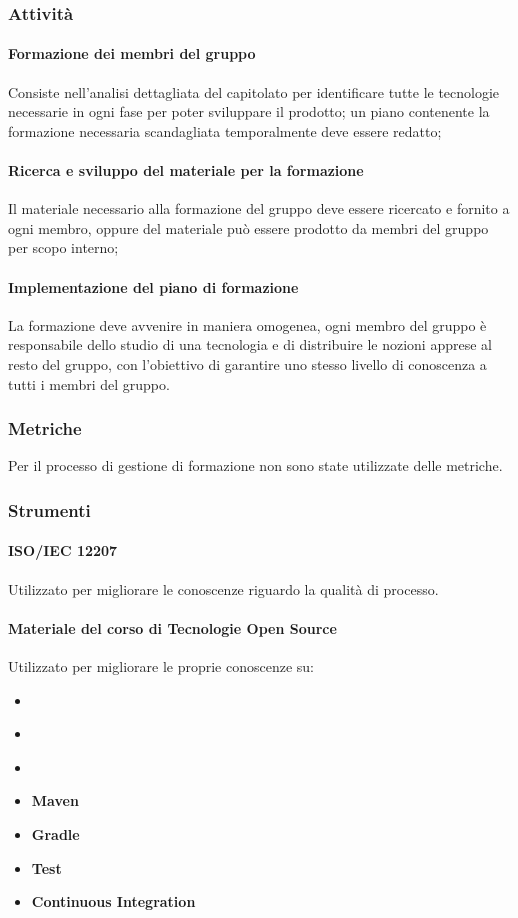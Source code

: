 \subsubsection{Attività}

\paragraph{Formazione dei membri del gruppo}
Consiste nell'analisi dettagliata del capitolato per identificare tutte le tecnologie necessarie in ogni fase per poter sviluppare il prodotto; un piano contenente la formazione necessaria scandagliata temporalmente deve essere redatto;
\paragraph{Ricerca e sviluppo del materiale per la formazione} 
Il materiale necessario alla formazione del gruppo deve essere ricercato e fornito a ogni membro, oppure del materiale può essere prodotto da membri del gruppo per scopo interno;
\paragraph{Implementazione del piano di formazione} 
La formazione deve avvenire in maniera omogenea, ogni membro del gruppo è responsabile dello studio di una tecnologia e di distribuire le nozioni apprese al resto del gruppo, con l'obiettivo di garantire uno stesso livello di conoscenza a tutti i membri del gruppo.

\subsubsection{Metriche} 
Per il processo di gestione di formazione non sono state utilizzate delle metriche.

\subsubsection{Strumenti} 
\paragraph{ISO/IEC 12207}
Utilizzato per migliorare le conoscenze riguardo la qualità di processo.
\paragraph{Materiale del corso di Tecnologie Open Source}
Utilizzato per migliorare le proprie conoscenze su:
\begin{itemize}
	\item \textbf{}
	\item \textbf{}
	\item \textbf{}
	\item \textbf{Maven}
	\item \textbf{Gradle}
	\item \textbf{Test}
	\item \textbf{Continuous Integration}
\end{itemize}
